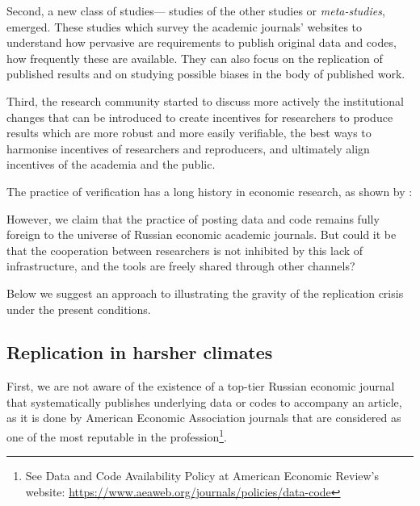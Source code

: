 \documentclass[12pt]{article}
\begin{document}
Second, a new class of studies--- studies of the other studies or  {\it meta-studies}, emerged. These studies which survey the academic  journals' websites to understand how pervasive are requirements to publish original data and codes, how frequently these are available. They can also focus on the  replication of published results and on studying possible biases in the body of published work. 

Third, the research community started to discuss more actively the institutional changes that can be introduced to create incentives for researchers to produce results which are more robust and more easily verifiable, the best ways to harmonise incentives of researchers and reproducers, and ultimately align incentives of the academia and the public.

The practice of verification has a long history in economic research, as shown by \cite{christensen2018transparency}: 

However, we claim that the practice of posting data and code remains fully foreign to the universe of Russian economic academic journals. But could it be that the cooperation between researchers is not inhibited by this lack of infrastructure, and the tools are freely shared through other channels?

Below we suggest an approach to illustrating the gravity of the replication crisis under the present conditions. 

\subsection{Replication in harsher climates}

First, we are not aware of the existence of a top-tier Russian economic journal that systematically publishes underlying data or codes to accompany an article, as it is done by American Economic Association journals that are considered as one of the most reputable in the profession\footnote{See Data and Code Availability Policy at American Economic Review's website:
\href{https://www.aeaweb.org/journals/policies/data-code}{https://www.aeaweb.org/journals/policies/data-code}}.
\end{document}
